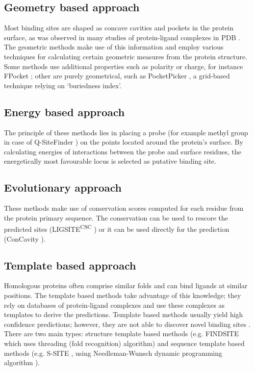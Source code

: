 \subsection{Geometry based approach}
Most binding sites are shaped as concave cavities and pockets in the protein surface, as was observed in many studies of protein-ligand complexes in PDB \cite{methods}. The geometric methods make use of this information and employ various techniques for calculating certain geometric measures from the protein structure. Some methods use additional properties such as polarity or charge, for instance FPocket \cite{fpocket}; other are purely geometrical, such as PocketPicker \cite{pocketpicker}, a grid-based technique relying on `buriedness index'.

\subsection{Energy based approach}
The principle of these methods lies in placing a probe (for example methyl group in case of Q-SiteFinder \cite{qsitefinder}) on the points located around the protein's surface. By calculating energies of interactions between the probe and surface residues, the energetically most favourable locus is selected as putative binding site.

\subsection{Evolutionary approach}
These methods make use of conservation scores computed for each residue from the protein primary sequence. The conservation can be used to rescore the predicted sites (LIGSITE\textsuperscript{CSC} \cite{ligsite}) or it can be used directly for the prediction (ConCavity \cite{concavity}).

\subsection{Template based approach}
Homologous proteins often comprise similar folds and can bind ligands at similar positions. The template based methods take advantage of this knowledge; they rely on databases of protein-ligand complexes and use these complexes as templates to derive the predictions. Template based methods usually yield high confidence predictions; however, they are not able to discover novel binding sites \cite{p2rank1}. There are two main types: structure template based methods (e.g. FINDSITE \cite{findsite} which uses threading (fold recognition) algorithm) and sequence template based methods (e.g. S-SITE \cite{coach}, using Needleman-Wunsch dynamic programming algorithm \cite{needleman}).

